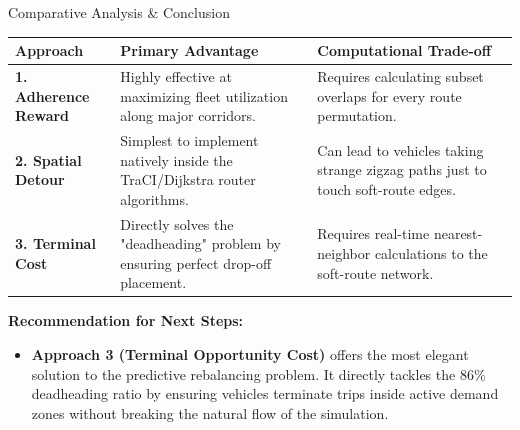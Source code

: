 \documentclass[aspectratio=169]{beamer}
\begin{document}
\begin{frame}{Comparative Analysis \& Conclusion}
  \begin{table}[]
      \centering
      \small
      \begin{tabular}{|p{2.5cm}|p{4cm}|p{4cm}|}
      \hline
      \textbf{Approach} & \textbf{Primary Advantage} & \textbf{Computational Trade-off} \\ \hline
      \textbf{1. Adherence Reward} & Highly effective at maximizing fleet utilization along major corridors. & Requires calculating subset overlaps for every route permutation. \\ \hline
      \textbf{2. Spatial Detour} & Simplest to implement natively inside the TraCI/Dijkstra router algorithms. & Can lead to vehicles taking strange zigzag paths just to touch soft-route edges. \\ \hline
      \textbf{3. Terminal Cost} & Directly solves the "deadheading" problem by ensuring perfect drop-off placement. & Requires real-time nearest-neighbor calculations to the soft-route network. \\ \hline
      \end{tabular}
  \end{table}
  
  \vspace{0.3cm}
  \textbf{Recommendation for Next Steps:}
  \begin{itemize}
      \item \textbf{Approach 3 (Terminal Opportunity Cost)} offers the most elegant solution to the predictive rebalancing problem. It directly tackles the 86\% deadheading ratio by ensuring vehicles terminate trips inside active demand zones without breaking the natural flow of the simulation.
  \end{itemize}
\end{frame}
\end{document}
